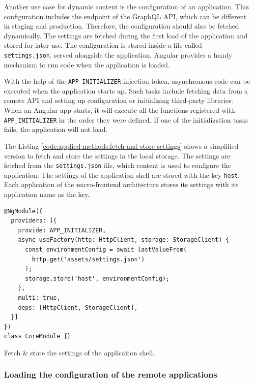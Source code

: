 \noindent Another use case for dynamic content is the configuration of an application. This configuration includes the endpoint of the GraphQL \ac{API}, which can be different in staging and production. Therefore, the configuration should also be fetched dynamically. The settings are fetched during the first load of the application and stored for later use. The configuration is stored inside a file called \texttt{settings.json}, served alongside the application. Angular provides a handy mechanism to run code when the application is loaded.

\bigskip

\noindent With the help of the \texttt{APP\_INITIALIZER} injection token, asynchronous code can be executed when the application starts up. Such tasks include fetching data from a remote \ac{API} and setting up configuration or initializing third-party libraries. When an Angular app starts, it will execute all the functions registered with \texttt{APP\_INITIALIZER} in the order they were defined. If one of the initialization tasks fails, the application will not load. \cite{misc:-:applied-methods:prototype-implementation:angular-app-initializer}

\bigskip

\noindent The Listing \ref{code:applied-methods:fetch-and-store-settings} shows a simplified version to fetch and store the settings in the local storage. The settings are fetched from the \texttt{settings.json} file, which content is used to configure the application. The settings of the application shell are stored with the key \texttt{host}. Each application of the micro-frontend architecture stores its settings with its application name as the key.

\ifshowListings
\begin{listing}[H]
\begin{verbatim}
@NgModule({
  providers: [{
    provide: APP_INITIALIZER,
    async useFactory(http: HttpClient, storage: StorageClient) {
      const environmentConfig = await lastValueFrom(
        http.get('assets/settings.json')
      );
      storage.store('host', environmentConfig);
    },
    multi: true,
    deps: [HttpClient, StorageClient],
  }]
})
class CoreModule {}
\end{verbatim}
\caption{Fetch \& store the settings of the application shell.}\label{code:applied-methods:fetch-and-store-settings}
\end{listing}
\fi

\subsubsection{Loading the configuration of the remote applications}\label{subsubsection:applied-methods:prototypical-implementation
:load-the-configuration}

